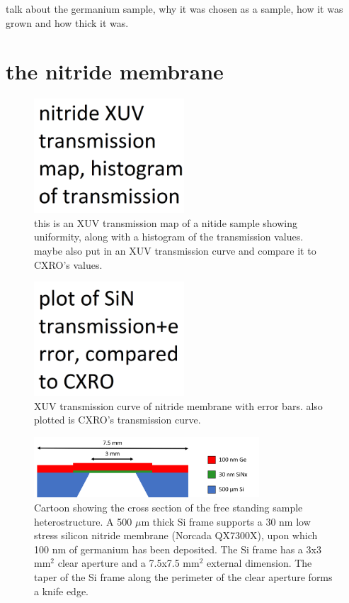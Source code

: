 talk about the germanium sample, why it was chosen as a sample, how it was grown and how thick it was.

\section{the nitride membrane}

\begin{figure}
	\centering
	\includegraphics[width=0.5\textwidth]{figures/chap3/Nitride_map.png}
	\caption{this is an XUV transmission map of a nitide sample showing uniformity, along with a histogram of the transmission values. maybe also put in an XUV transmission curve and compare it to CXRO's values.}
	\label{fig:Nitride_map}
\end{figure}

\begin{figure}
	\centering
	\includegraphics[width=0.5\textwidth]{figures/chap3/Nitride_transmission.png}
	\caption{XUV transmission curve of nitride membrane with error bars. also plotted is CXRO's transmission curve.}
	\label{fig:Nitride_transmission}
\end{figure}

\begin{figure}
	\centering
	\includegraphics[width=0.75\textwidth]{figures/chap3/Sample_Geometry.png}
	\caption{Cartoon showing the cross section of the free standing sample heterostructure. A 500 $\mu$m thick Si frame supports a 30 nm low stress silicon nitride membrane (Norcada QX7300X), upon which 100 nm of germanium has been deposited. The Si frame has a 3x3 mm$^2$ clear aperture and a 7.5x7.5 mm$^2$ external dimension. The taper of the Si frame along the perimeter of the clear aperture forms a knife edge.}
	\label{fig:Sample_Geometry}
\end{figure}


